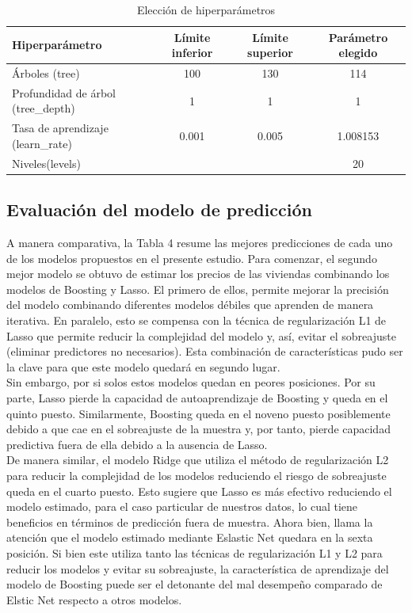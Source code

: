 \documentclass[12pt]{article}
\begin{document}
    \begin{table}[ht]
    \centering
    \begin{tabular}{lccc}
    \hline
    Hiperparámetro & Límite inferior & Límite superior & Parámetro elegido \\
    \hline
    Árboles (tree) & 100 & 130 & 114 \\
    Profundidad de árbol (tree\_depth) & 1 & 1 & 1  \\
    Tasa de aprendizaje (learn\_rate) & 0.001 & 0.005 & 1.008153  \\
    Niveles(levels) &  &  & 20  \\
    \hline
    \end{tabular}
    \caption{Elección de hiperparámetros}
    \end{table}


\subsection{Evaluación del modelo de predicción}

A manera comparativa, la Tabla 4 resume las mejores predicciones de cada uno de los modelos propuestos en el presente estudio. Para comenzar, el segundo mejor modelo se obtuvo de estimar los precios de las viviendas combinando los modelos de Boosting y Lasso.  El primero de ellos, permite mejorar la precisión del modelo combinando diferentes modelos débiles que aprenden de manera iterativa. En paralelo, esto se compensa con la técnica de regularización L1 de Lasso que permite reducir la complejidad del modelo y, así, evitar el sobreajuste (eliminar predictores no necesarios). Esta combinación de características pudo ser la clave para que este modelo quedará en segundo lugar. \\

Sin embargo, por si solos estos modelos quedan en peores posiciones. Por su parte, Lasso pierde la capacidad de autoaprendizaje de Boosting y queda en el quinto puesto. Similarmente, Boosting queda en el noveno puesto posiblemente debido a que cae en el sobreajuste de la muestra y, por tanto, pierde capacidad predictiva fuera de ella debido a la ausencia de Lasso. \\

De manera similar, el modelo Ridge que utiliza el método de regularización L2 para reducir la complejidad de los modelos reduciendo el riesgo de sobreajuste queda en el cuarto puesto. Esto sugiere que Lasso es más efectivo reduciendo el modelo estimado, para el caso particular de nuestros datos, lo cual tiene beneficios en términos de predicción fuera de muestra. Ahora bien, llama la atención que el modelo estimado mediante Eslastic Net quedara en la sexta posición. Si bien este utiliza tanto las técnicas de regularización L1 y L2 para reducir los modelos y evitar su sobreajuste, la característica de aprendizaje del modelo de Boosting puede ser el detonante del mal desempeño comparado de Elstic Net respecto a otros modelos. \\
\end{document}

